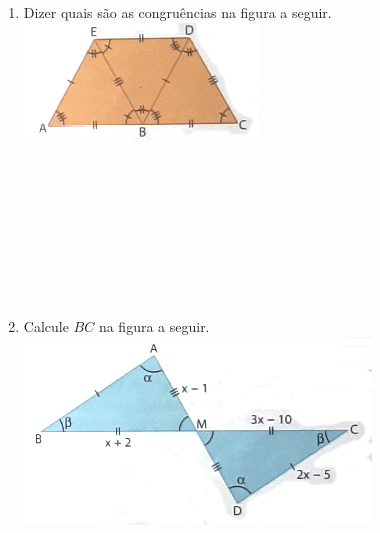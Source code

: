 \documentclass[a4paper,14pt]{article}
\begin{document}
\begin{multicols}{2}
\begin{enumerate}
				\\\\\\\\\\\\\\
			\item Dizer quais são as congruências na figura a seguir.
			\\
			\includegraphics[width=1.1\linewidth]{6FMA109_imagens/imagem3}
			\\\\\\\\\\\\\\\\\\
			\item Calcule $BC$ na figura a seguir. \\
			\includegraphics[width=1.1\linewidth]{6FMA109_imagens/imagem4}
			\\\\\\\\\\\\\\\\\\

\end{enumerate}
\end{multicols}
\end{document}
